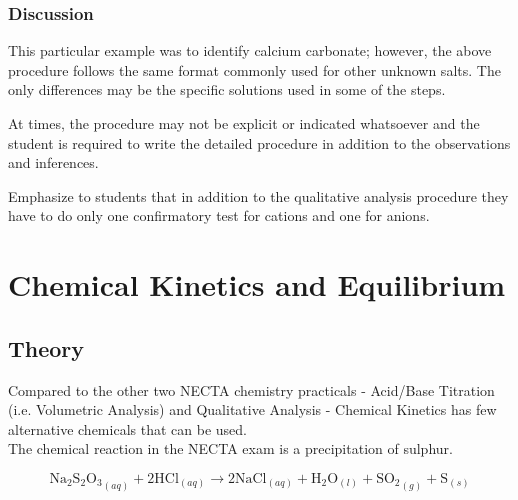 \subsubsection{Discussion}
This particular example was to identify calcium carbonate; however, the above procedure follows the same format commonly used for other unknown salts. The only differences may be the specific solutions used in some of the steps.

At times, the procedure may not be explicit or indicated whatsoever and the student is required to write the detailed procedure in addition to the observations and inferences. %

Emphasize to students that in addition to the qualitative analysis procedure they have to do only one confirmatory test for cations and one for anions.



\section{Chemical Kinetics and Equilibrium}   


\subsection{Theory}
Compared to the other two NECTA chemistry practicals - Acid/Base Titration (i.e. Volumetric Analysis) and Qualitative Analysis - Chemical Kinetics has few alternative chemicals that can be used.\\

The chemical reaction in the NECTA exam is a precipitation of sulphur. 

\[ \mathrm{Na_2S_2O_3}_{(aq)} + \mathrm{2HCl}_{(aq)} \longrightarrow \mathrm{2NaCl}_{(aq)} + \mathrm{H}_{2}\mathrm{O}_{(l)} + \mathrm{SO_2}_{(g)} + \mathrm{S}_{(s)} \]


